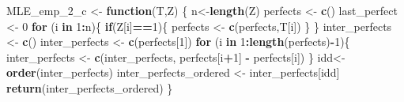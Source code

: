\documentclass[
]{article}
\newenvironment{Shaded}{\begin{snugshade}}{\end{snugshade}}
\newcommand{\ControlFlowTok}[1]{\textcolor[rgb]{0.13,0.29,0.53}{\textbf{#1}}}
\newcommand{\DecValTok}[1]{\textcolor[rgb]{0.00,0.00,0.81}{#1}}
\newcommand{\FunctionTok}[1]{\textcolor[rgb]{0.13,0.29,0.53}{\textbf{#1}}}
\newcommand{\NormalTok}[1]{#1}
\newcommand{\OtherTok}[1]{\textcolor[rgb]{0.56,0.35,0.01}{#1}}
\newcommand{\SpecialCharTok}[1]{\textcolor[rgb]{0.81,0.36,0.00}{\textbf{#1}}}
\begin{document}
\begin{Shaded}
\begin{Highlighting}[]
\NormalTok{MLE\_emp\_2\_c }\OtherTok{\textless{}{-}} \ControlFlowTok{function}\NormalTok{(T,Z)}
\NormalTok{\{}
\NormalTok{  n}\OtherTok{\textless{}{-}}\FunctionTok{length}\NormalTok{(Z)}
\NormalTok{  perfects }\OtherTok{\textless{}{-}} \FunctionTok{c}\NormalTok{()}
\NormalTok{  last\_perfect }\OtherTok{\textless{}{-}} \DecValTok{0}
  \ControlFlowTok{for}\NormalTok{ (i }\ControlFlowTok{in} \DecValTok{1}\SpecialCharTok{:}\NormalTok{n)\{}
    \ControlFlowTok{if}\NormalTok{(Z[i]}\SpecialCharTok{==}\DecValTok{1}\NormalTok{)\{}
\NormalTok{      perfects }\OtherTok{\textless{}{-}} \FunctionTok{c}\NormalTok{(perfects,T[i])}
\NormalTok{    \}}
\NormalTok{  \}}
\NormalTok{  inter\_perfects }\OtherTok{\textless{}{-}} \FunctionTok{c}\NormalTok{()}
\NormalTok{  inter\_perfects }\OtherTok{\textless{}{-}} \FunctionTok{c}\NormalTok{(perfects[}\DecValTok{1}\NormalTok{])}
  \ControlFlowTok{for}\NormalTok{ (i }\ControlFlowTok{in} \DecValTok{1}\SpecialCharTok{:}\FunctionTok{length}\NormalTok{(perfects)}\SpecialCharTok{{-}}\DecValTok{1}\NormalTok{)\{}
\NormalTok{    inter\_perfects }\OtherTok{\textless{}{-}} \FunctionTok{c}\NormalTok{(inter\_perfects, perfects[i}\SpecialCharTok{+}\DecValTok{1}\NormalTok{] }\SpecialCharTok{{-}}\NormalTok{ perfects[i])}
\NormalTok{  \}}
\NormalTok{  idd}\OtherTok{\textless{}{-}}\FunctionTok{order}\NormalTok{(inter\_perfects)}
\NormalTok{  inter\_perfects\_ordered }\OtherTok{\textless{}{-}}\NormalTok{ inter\_perfects[idd]}
  \FunctionTok{return}\NormalTok{(inter\_perfects\_ordered)}
\NormalTok{\}}


\end{Highlighting}
\end{Shaded}
\end{document}
